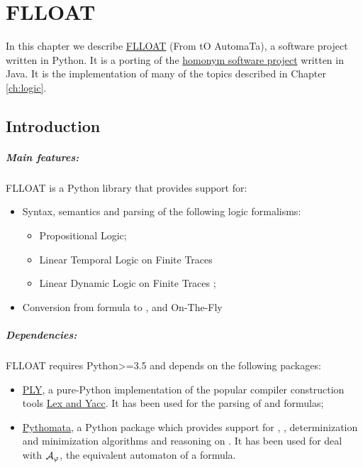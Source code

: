 \chapter{FLLOAT}\label{ch:flloat}
In this chapter we describe \href{https://github.com/MarcoFavorito/flloat.git}{FLLOAT} (From \LLf tO AutomaTa), a software project written in Python. It is a porting of the \href{https://github.com/RiccardoDeMasellis/FLLOAT}{homonym software project} written in Java. It is the implementation of many of the topics described in Chapter \ref{ch:logic}. 


\section{Introduction}
\paragraph{Main features:} FLLOAT is a Python library that provides support for:
\begin{itemize}
	
	\item Syntax, semantics and parsing of the following logic formalisms:
	\begin{itemize}
		\item Propositional Logic;
		\item Linear Temporal Logic on Finite Traces \LTLf
		\item Linear Dynamic Logic on Finite Traces \LDLf;
	\end{itemize}
	\item Conversion from \LLf formula to \NFA, \DFA and \DFA On-The-Fly
	
\end{itemize}

\paragraph{Dependencies:} FLLOAT requires Python>=3.5 and depends on the following packages:
\begin{itemize}
	\item \href{http://www.dabeaz.com/ply/ply.html}{PLY}, a pure-Python implementation of the popular compiler construction tools \href{http://dinosaur.compilertools.net/}{Lex and Yacc}. It has been used for the parsing of \PL and \LLf formulas;
	\item \href{https://github.com/MarcoFavorito/pythomata}{Pythomata}, a Python package which provides support for \NFA, \DFA, determinization and minimization algorithms and reasoning on \DFAs. It has been used for deal with $\mathcal{A}_\varphi$, the equivalent automaton of a \LLf formula.
\end{itemize}

